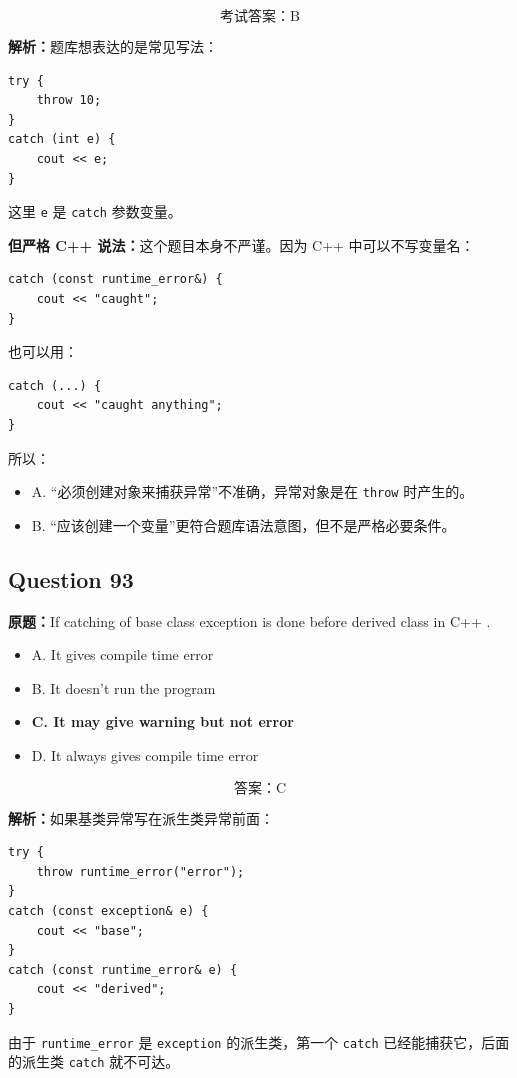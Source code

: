 \documentclass[11pt, a4paper]{article}
\begin{document}
\[
\boxed{\text{考试答案：B}}
\]

\textbf{解析：}题库想表达的是常见写法：
\begin{lstlisting}
try {
    throw 10;
}
catch (int e) {
    cout << e;
}
\end{lstlisting}
这里 \texttt{e} 是 \texttt{catch} 参数变量。

\textbf{但严格 C++ 说法：}这个题目本身不严谨。因为 C++ 中可以不写变量名：
\begin{lstlisting}
catch (const runtime_error&) {
    cout << "caught";
}
\end{lstlisting}
也可以用：
\begin{lstlisting}
catch (...) {
    cout << "caught anything";
}
\end{lstlisting}

所以：
\begin{itemize}
    \item A. “必须创建对象来捕获异常”不准确，异常对象是在 \texttt{throw} 时产生的。
    \item B. “应该创建一个变量”更符合题库语法意图，但不是严格必要条件。
\end{itemize}


\subsection*{Question 93}
\textbf{原题：}If catching of base class exception is done before derived class in C++ \underline{\hspace{2cm}}.
\begin{itemize}
    \item A. It gives compile time error
    \item B. It doesn’t run the program
    \item \textbf{C. It may give warning but not error}
    \item D. It always gives compile time error
\end{itemize}

\[
\boxed{\text{答案：C}}
\]

\textbf{解析：}如果基类异常写在派生类异常前面：
\begin{lstlisting}
try {
    throw runtime_error("error");
}
catch (const exception& e) {
    cout << "base";
}
catch (const runtime_error& e) {
    cout << "derived";
}
\end{lstlisting}
由于 \texttt{runtime\_error} 是 \texttt{exception} 的派生类，第一个 \texttt{catch} 已经能捕获它，后面的派生类 \texttt{catch} 就不可达。
\end{document}
